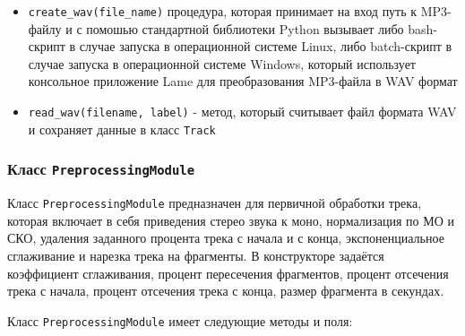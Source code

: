 \begin{itemize}
\item{ \texttt{create\_wav(file\_name)}  процедура, которая принимает на вход путь к MP3-файлу и с помошью стандартной библиотеки Python вызывает либо bash-скрипт в случае запуска в операционной системе Linux, либо batch-скрипт в случае запуска в операционной системе Windows, который использует консольное приложение Lame для преобразования MP3-файла в WAV формат}
\item{ \texttt{read\_wav(filename, label)} - метод, который считывает файл формата WAV и сохраняет данные в класс \texttt{Track}}
\end{itemize}


\subsubsection{Класс \texttt{PreprocessingModule}}

Класс \texttt{PreprocessingModule} предназначен для первичной обработки трека, которая включает в себя приведения стерео звука к моно, нормализация по МО и СКО, 
удаления заданного процента трека с начала и с конца, экспоненциальное сглаживание и нарезка трека на фрагменты. В конструкторе задаётся коэффициент сглаживания, процент пересечения фрагментов, процент отсечения трека с начала, процент отсечения трека с конца, размер фрагмента в секундах.

Класс \texttt{PreprocessingModule} имеет следующие методы и поля:

